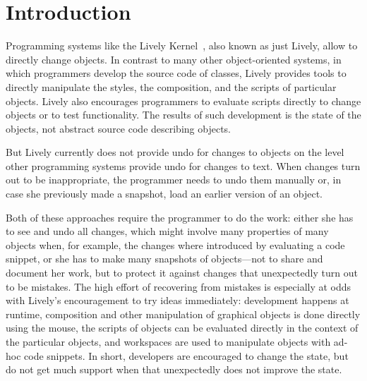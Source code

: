 
\chapter{Introduction} \label{sec:INTRODUCTION}

Programming systems like the Lively Kernel~\cite{Ingalls2008LKS,Krahn2009LWD}, also known as just Lively, allow to directly change objects.
In contrast to many other object-oriented systems, in which programmers develop the source code of classes, Lively provides tools to directly manipulate the styles, the composition, and the scripts of particular objects.
Lively also encourages programmers to evaluate scripts directly to change objects or to test functionality.
The results of such development is the state of the objects, not abstract source code describing objects.

But Lively currently does not provide undo for changes to objects on the level other programming systems provide undo for changes to text.
When changes turn out to be inappropriate, the programmer needs to undo them manually or, in case she previously made a snapshot, load an earlier version of an object.

Both of these approaches require the programmer to do the work: either she has to see and undo all changes, which might involve many properties of many objects when, for example, the changes where introduced by evaluating a code snippet, or she has to make many snapshots of objects---not to share and document her work, but to protect it against changes that unexpectedly turn out to be mistakes.
The high effort of recovering from mistakes is especially at odds with Lively's encouragement to try ideas immediately: development happens at runtime, composition and other manipulation of graphical objects is done directly using the mouse, the scripts of objects can be evaluated directly in the context of the particular objects, and workspaces are used to manipulate objects with ad-hoc code snippets.
In short, developers are encouraged to change the state, but do not get much support when that unexpectedly does not improve the state.

